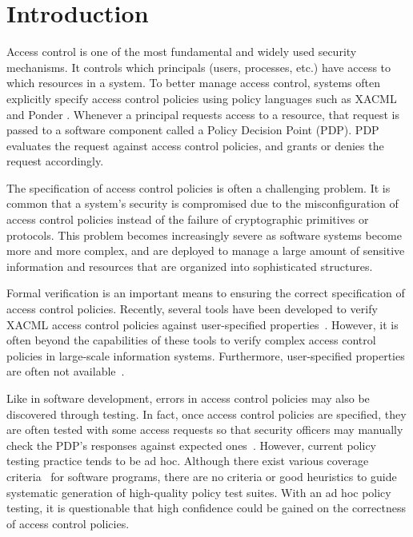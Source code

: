 \section{Introduction}

\label{sec:introduction}

Access control is one of the most fundamental and widely used
security mechanisms. It controls which principals (users, processes,
etc.) have access to which resources in a system. To better manage
access control, systems often explicitly specify access control
policies using policy languages such as XACML~\cite{oasis05:xacml}
and Ponder \cite{damianou01:ponder}. Whenever a principal requests
access to a resource, that request is passed to a software component
called a Policy Decision Point (PDP). PDP evaluates the request
against access control policies, and grants or denies the request
accordingly.

The specification of access control policies is often a challenging
problem. It is common that a system's security is compromised due to
the misconfiguration of access control policies instead of the
failure of cryptographic primitives or protocols. This problem
becomes increasingly severe as software systems become more and more
complex, and are deployed to manage a large amount of sensitive
information and resources that are organized into sophisticated
structures.

Formal verification is an important means to ensuring the correct
specification of access control
policies.
Recently, several tools have been developed to verify XACML access
control policies against user-specified
properties~\cite{hughes04:automated,fisler05:verification,zhang05:evaluating}.
However, it is often beyond the capabilities of these tools to
verify complex access control policies in large-scale information
systems. Furthermore, user-specified properties are often not
available~\cite{fisler05:verification}.

Like in software development, errors in access control policies may
also be discovered through testing. In fact, once access control
policies are specified, they are often tested with some access
requests so that security officers may manually check the PDP's
responses against expected ones~\cite{anderson02:xacml}. However,
current policy testing practice tends to be ad hoc. Although there
exist various coverage criteria~\cite{zhu97:software} for software
programs, there are no criteria or good heuristics to guide
systematic generation of high-quality policy test suites. With an ad
hoc policy testing, it is questionable that high confidence could be
gained on the correctness of access control policies.

